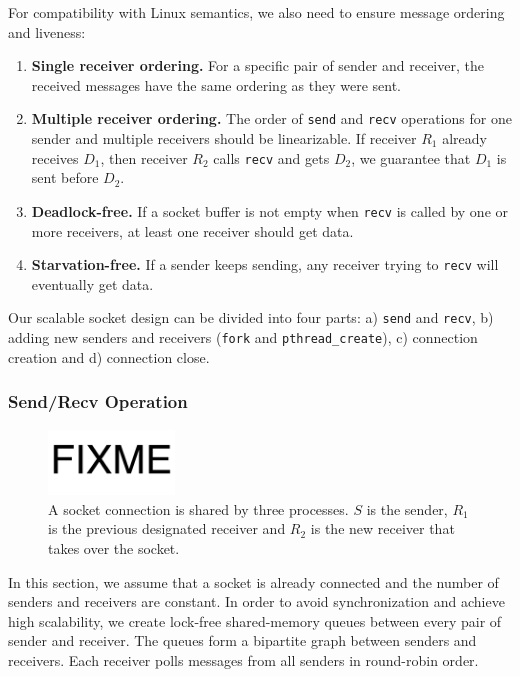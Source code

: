 For compatibility with Linux semantics, we also need to ensure message ordering and liveness:
\begin{enumerate}
\item \textbf{Single receiver ordering.} For a specific pair of sender and receiver, the received messages have the same ordering as they were sent.
\item \textbf{Multiple receiver ordering.} The order of \texttt{send} and \texttt{recv} operations for one sender and multiple receivers should be linearizable. If receiver $R_1$ already receives $D_1$, then receiver $R_2$ calls \texttt{recv} and gets $D_2$, we guarantee that $D_1$ is sent before $D_2$.
\item \textbf{Deadlock-free.} If a socket buffer is not empty when \texttt{recv} is called by one or more receivers, at least one receiver should get data.
\item \textbf{Starvation-free.} If a sender keeps sending, any receiver trying to \texttt{recv} will eventually get data.
\end{enumerate}

Our scalable socket design can be divided into four parts: a) \texttt{send} and \texttt{recv}, b) adding new senders and receivers (\texttt{fork} and \texttt{pthread\_create}), c) connection creation and d) connection close.

\subsubsection{Send/Recv Operation}
\label{subsubsec:fork_rdwr}

\begin{figure}[t]
	\centering
	\includegraphics[width=0.3\textwidth]{images/fixme}
	\caption{A socket connection is shared by three processes. $S$ is the sender, $R_1$ is the previous designated receiver and $R_2$ is the new receiver that takes over the socket.}
	\label{fig:fork-takeover}
\end{figure}

In this section, we assume that a socket is already connected and the number of senders and receivers are constant. In order to avoid synchronization and achieve high scalability, we create lock-free shared-memory queues between every pair of sender and receiver. The queues form a bipartite graph between senders and receivers. Each receiver polls messages from all senders in round-robin order.

